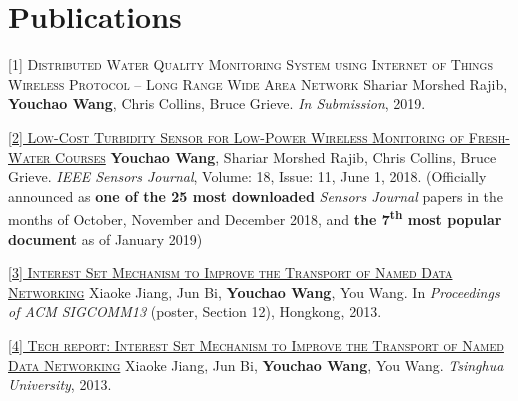 \documentclass[11pt,a4paper]{moderncv}
\begin{document}
\vspace*{-0.0cm}

\section{Publications}

\textsc{[1] Distributed Water Quality Monitoring System using Internet of Things Wireless Protocol – Long Range Wide Area Network}
\newline  Shariar Morshed Rajib, \textbf{Youchao Wang}, Chris Collins, Bruce Grieve. \textit{In Submission}, 2019.

\href{https://ieeexplore.ieee.org/document/8337739}{\textsc{[2] Low-Cost Turbidity Sensor for Low-Power Wireless Monitoring of Fresh-Water Courses}}
\newline  \textbf{Youchao Wang}, Shariar Morshed Rajib, Chris Collins, Bruce Grieve. \textit{IEEE Sensors Journal}, Volume: 18, Issue: 11, June 1, 2018. (Officially announced as \textbf{one of the 25 most downloaded} \textit{Sensors Journal} papers in the months of October, November and December 2018, and \textbf{the 7\textsuperscript{th} most popular document} as of January 2019)

\href{https://ndnsim.net/2.3/ndnsim-research-papers.html}{\textsc{[3] Interest Set Mechanism to Improve the Transport of Named Data Networking}}
\newline  Xiaoke Jiang, Jun Bi, \textbf{Youchao Wang}, You Wang. In \textit{Proceedings of ACM SIGCOMM13} (poster, Section 12), Hongkong, 2013. 

\href{http://netarchlab.tsinghua.edu.cn/~shock/THU-NetArchLab-ICN-TR-ISTSET-20130517.pdf}{\textsc{[4] Tech report: Interest Set Mechanism to Improve the Transport of Named Data Networking}}
\newline  Xiaoke Jiang, Jun Bi, \textbf{Youchao Wang}, You Wang.\textit{ Tsinghua University}, 2013.  
\end{document}
